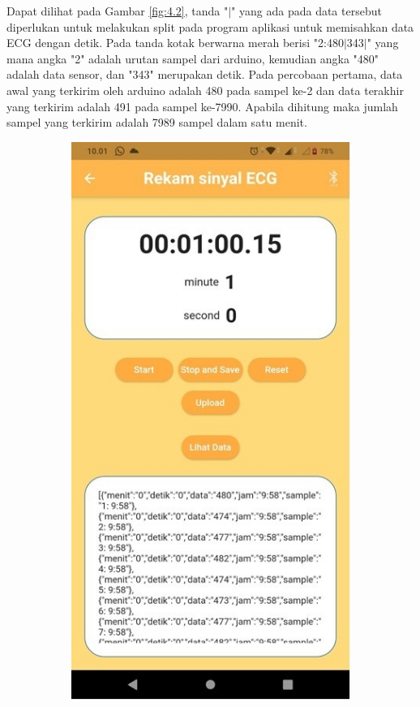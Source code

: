 \vspace{1ex}
Dapat dilihat pada Gambar \ref{fig:4.2}, tanda "$\mid$" yang ada pada data tersebut diperlukan untuk melakukan split pada program aplikasi untuk memisahkan data ECG dengan detik. Pada tanda kotak berwarna merah berisi "2:480$\mid$343$\mid$" yang mana angka "2" adalah urutan sampel dari arduino, kemudian angka "480" adalah data sensor, dan "343" merupakan detik. Pada percobaan pertama, data awal yang terkirim oleh arduino adalah 480 pada sampel ke-2 dan data terakhir yang terkirim adalah 491 pada sampel ke-7990. Apabila dihitung maka jumlah sampel yang terkirim adalah 7989 sampel dalam satu menit.
\begin{figure}[H] \centering
	\begin{subfigure}{0.45\textwidth}
		\centering
		\includegraphics[width=1\linewidth]{img/percob/Slide11a}	  

\end{subfigure}
\end{figure}
